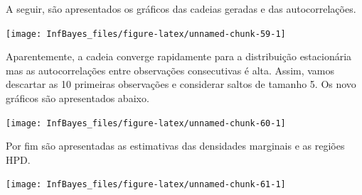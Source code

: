 \documentclass[
]{book}
\begin{document}
A seguir, são apresentados os gráficos das cadeias geradas e das autocorrelações.

\begin{center}\texttt{[image: InfBayes\_files/figure-latex/unnamed-chunk-59-1]} \end{center}

Aparentemente, a cadeia converge rapidamente para a distribuição estacionária mas as autocorrelações entre observações consecutivas é alta. Assim, vamos descartar as 10 primeiras observações e considerar saltos de tamanho 5. Os novo gráficos são apresentados abaixo.

\begin{center}\texttt{[image: InfBayes\_files/figure-latex/unnamed-chunk-60-1]} \end{center}

Por fim são apresentadas as estimativas das densidades marginais e as regiões HPD.

\begin{center}\texttt{[image: InfBayes\_files/figure-latex/unnamed-chunk-61-1]} \end{center}
\end{document}
